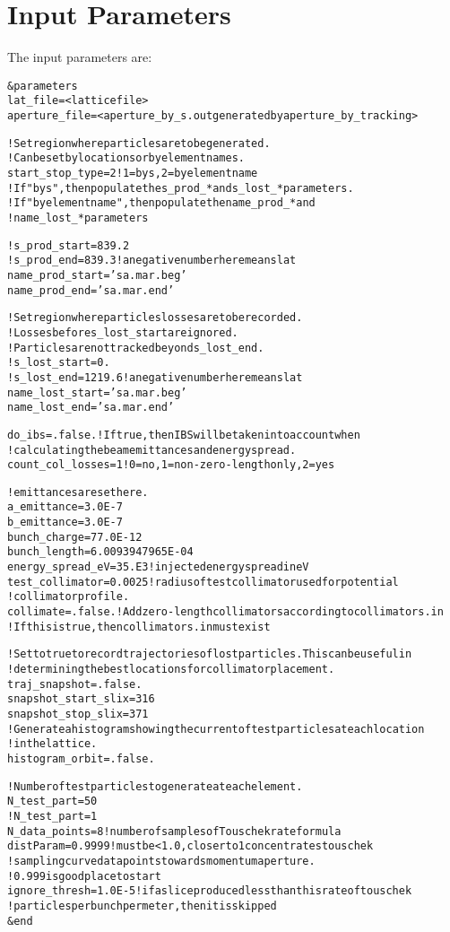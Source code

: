 \documentclass[11pt]{article}
\newlength{\ExBeg}
\newlength{\ExEnd}
\newenvironment{example}
  {\vspace{\ExBeg} \begin{alltt}}
  {\end{alltt} \vspace{\ExEnd}}
\begin{document}
\section{Input Parameters}
The input parameters are:
\begin{example}
\&parameters
  lat_file = <lattice file>
  aperture_file = <aperture_by_s.out generated by aperture_by_tracking>

	! Set region where particles are to be generated.
	! Can be set by location s or by element names.
  start_stop_type = 2 !1=by s, 2=by element name
  ! If "by s", then populate the s_prod_* and s_lost_* parameters.
  ! If "by element name", then populate the name_prod_* and 
  ! name_lost_* parameters

  ! s_prod_start = 839.2
  ! s_prod_end = 839.3  !a negative number here means lat%
  name_prod_start = 'sa.mar.beg'
  name_prod_end   = 'sa.mar.end'

	! Set region where particles losses are to be recorded.
	! Losses before s_lost_start are ignored.
	! Particles are not tracked beyond s_lost_end.
  ! s_lost_start = 0.
  ! s_lost_end = 1219.6  !a negative number here means lat%
  name_lost_start = 'sa.mar.beg'
  name_lost_end   = 'sa.mar.end'

  do_ibs = .false. !If true, then IBS will be taken into account when
                   !calculating the beam emittances and energy spread.
  count_col_losses = 1 ! 0=no, 1=non-zero-length only, 2 = yes

  ! emittances are set here.
  a_emittance = 3.0E-7
  b_emittance = 3.0E-7
  bunch_charge = 77.0E-12
  bunch_length = 6.0093947965E-04
  energy_spread_eV = 35.E3    !injected energy spread in eV
  test_collimator = 0.0025    !radius of test collimator used for potential 
                              ! collimator profile.
  collimate = .false.  !Add zero-length collimators according to collimators.in
                       !If this is true, then collimators.in must exist

  ! Set to true to record trajectories of lost particles.  This can be useful in 
  ! determining the best locations for collimator placement.
  traj_snapshot = .false.
  snapshot_start_slix = 316
  snapshot_stop_slix = 371
  ! Generate a histogram showing the current of test particles at each location
  ! in the lattice.
  histogram_orbit = .false.

  ! Number of test particles to generate at each element.
  N_test_part = 50
  !N_test_part = 1
  N_data_points = 8  ! number of samples of Touschek rate formula
  distParam = 0.9999 ! must be < 1.0, closer to 1 concentrates touschek 
                     ! sampling curve data points towards momentum aperture.  
                     ! 0.999 is good place to start
  ignore_thresh = 1.0E-5 !if a slice produced less than this rate of touschek 
                         !particles per bunch per meter,then it is skipped
&end
\end{example}
\end{document}
